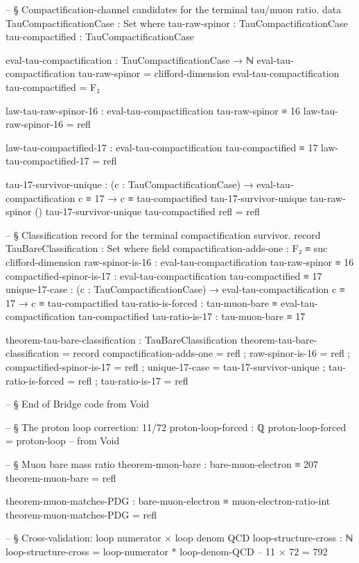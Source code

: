 \documentclass[11pt,a4paper]{book}
\begin{document}
\begin{code}
-- § Compactification-channel candidates for the terminal tau/muon ratio.
data TauCompactificationCase : Set where
  tau-raw-spinor     : TauCompactificationCase
  tau-compactified   : TauCompactificationCase

eval-tau-compactification : TauCompactificationCase → ℕ
eval-tau-compactification tau-raw-spinor   = clifford-dimension
eval-tau-compactification tau-compactified = F₂

law-tau-raw-spinor-16 : eval-tau-compactification tau-raw-spinor ≡ 16
law-tau-raw-spinor-16 = refl

law-tau-compactified-17 : eval-tau-compactification tau-compactified ≡ 17
law-tau-compactified-17 = refl

tau-17-survivor-unique :
  (c : TauCompactificationCase) →
  eval-tau-compactification c ≡ 17 →
  c ≡ tau-compactified
tau-17-survivor-unique tau-raw-spinor ()
tau-17-survivor-unique tau-compactified refl = refl

-- § Classification record for the terminal compactification survivor.
record TauBareClassification : Set where
  field
    compactification-adds-one : F₂ ≡ suc clifford-dimension
    raw-spinor-is-16 : eval-tau-compactification tau-raw-spinor ≡ 16
    compactified-spinor-is-17 : eval-tau-compactification tau-compactified ≡ 17
    unique-17-case :
      (c : TauCompactificationCase) →
      eval-tau-compactification c ≡ 17 →
      c ≡ tau-compactified
    tau-ratio-is-forced : tau-muon-bare ≡ eval-tau-compactification tau-compactified
    tau-ratio-is-17 : tau-muon-bare ≡ 17

theorem-tau-bare-classification : TauBareClassification
theorem-tau-bare-classification = record
  { compactification-adds-one = refl
  ; raw-spinor-is-16 = refl
  ; compactified-spinor-is-17 = refl
  ; unique-17-case = tau-17-survivor-unique
  ; tau-ratio-is-forced = refl
  ; tau-ratio-is-17 = refl
  }




-- § End of Bridge code from Void


-- § The proton loop correction: 11/72
proton-loop-forced : ℚ
proton-loop-forced = proton-loop  -- from Void

-- § Muon bare mass ratio
theorem-muon-bare : bare-muon-electron ≡ 207
theorem-muon-bare = refl

theorem-muon-matches-PDG : bare-muon-electron ≡ muon-electron-ratio-int
theorem-muon-matches-PDG = refl

-- § Cross-validation: loop numerator × loop denom QCD
loop-structure-cross : ℕ
loop-structure-cross = loop-numerator * loop-denom-QCD  -- 11 × 72 = 792


\end{code}
\end{document}
